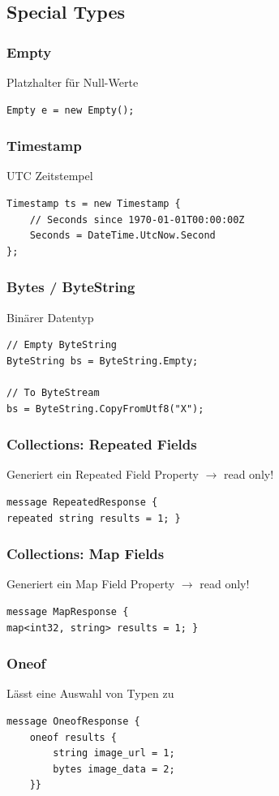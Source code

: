\subsection{Special Types}
\subsubsection{Empty}
Platzhalter für Null-Werte
\begin{lstlisting}
Empty e = new Empty();
\end{lstlisting}

\subsubsection{Timestamp}
UTC Zeitstempel
\begin{lstlisting}
Timestamp ts = new Timestamp {
    // Seconds since 1970-01-01T00:00:00Z 
    Seconds = DateTime.UtcNow.Second
};
\end{lstlisting}

\subsubsection{Bytes / ByteString}
Binärer Datentyp
\begin{lstlisting}
// Empty ByteString
ByteString bs = ByteString.Empty;

// To ByteStream
bs = ByteString.CopyFromUtf8("X");
\end{lstlisting}

\subsubsection{Collections: Repeated Fields}
Generiert ein Repeated Field Property $\rightarrow$ read only!
\begin{lstlisting}
message RepeatedResponse {
repeated string results = 1; }
\end{lstlisting}

\subsubsection{Collections: Map Fields}
Generiert ein Map Field Property $\rightarrow$ read only!
\begin{lstlisting}
message MapResponse {
map<int32, string> results = 1; }
\end{lstlisting}

\subsubsection{Oneof}
Lässt eine Auswahl von Typen zu
\begin{lstlisting}
message OneofResponse {
    oneof results {
        string image_url = 1;
        bytes image_data = 2;
    }}
\end{lstlisting}
